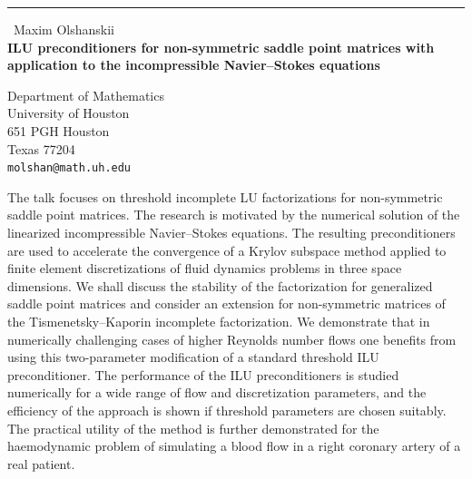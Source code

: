 \documentclass{report}
\begin{document}
\begin{center}
\rule{6in}{1pt} \
{\large Maxim Olshanskii \\
{\bf ILU preconditioners for non-symmetric saddle point matrices with application to the incompressible Navier--Stokes equations}}

Department of Mathematics \\ University of Houston \\ 651 PGH Houston \\ Texas 77204
\\
{\tt molshan@math.uh.edu}\end{center}

The talk focuses on threshold incomplete LU factorizations for
non-symmetric saddle point matrices. The research is motivated by the
numerical solution of the linearized incompressible Navier--Stokes
equations. The resulting preconditioners are used to accelerate the
convergence of a Krylov subspace method applied to finite element
discretizations of fluid dynamics problems in three space dimensions. We
shall discuss the stability of the factorization for generalized saddle
point matrices and consider an extension for non-symmetric matrices of
the Tismenetsky--Kaporin incomplete factorization. We demonstrate that in
numerically challenging cases of higher Reynolds number flows one
benefits from using this two-parameter modification of a standard
threshold ILU preconditioner. The performance of the ILU preconditioners
is studied numerically for a wide range of flow and discretization
parameters, and the efficiency of the approach is shown if threshold
parameters are chosen suitably. The practical utility of the method is
further demonstrated for the haemodynamic problem of simulating a blood
flow in a right coronary artery of a real patient.
\end{document}
